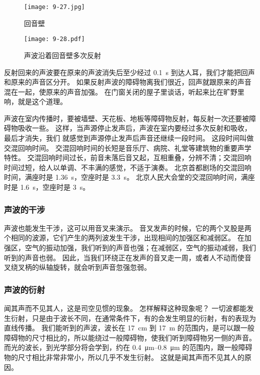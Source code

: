 \begin{figure}
  \begin{minipage}[b]{0.55\linewidth}\centering
    \texttt{[image: 9-27.jpg]}
    \caption{回音壁}\label{fig:9-27}
  \end{minipage}\hfill
  \begin{minipage}[b]{0.42\linewidth}\centering
    \texttt{[image: 9-28.pdf]}
    \caption{声波沿着回音壁多次反射}\label{fig:9-28}
  \end{minipage}
\end{figure}

反射回来的声波要在原来的声波消失后至少经过 \qty{0.1}{s} 到达人耳，我们才能把回声和原来的声音区分开。
如果反射声波的障碍物离我们很近，回声就跟原来的声音混在一起，使原来的声音加强。
在门窗关闭的屋子里谈话，听起来比在旷野里响，就是这个道理。

声波在室内传播时，要被墙壁、天花板、地板等障碍物反射，每反射一次还要被障碍物吸收一些。
这样，当声源停止发声后，声波在室内要经过多次反射和吸收，最后才消失，我们
就感觉到声源停止发声后声音还继续一段时间。
这段时间叫做交混回响时间。
交混回响时间的长短是音乐厅、病院、礼堂等建筑物的重要声学特性。
交混回响时间过长，前音未落后音又起，互相重叠，分辨不清；交混回响时间过短，给人以单调、不丰满的感觉，不适于演奏。
北京首都剧场的交混回响时间，满座时是 \qty{1.36}{s}，空座时是 \qty{3.3}{s}。
北京人民大会堂的交混回响时间，满座时是 \qty{1.6}{s}，空座时是 \qty{3}{s}。

\subsubsection{声波的干涉}
声波也能发生干涉，这可以用音叉来演示。
音叉发声的时候，它的两个叉股是两个相同的波源，它们产生的两列波发生干涉，出现相间的加强区和减弱区。
在加强区，空气的振动加强，我们听到的声音也强；在减弱区，空气的振动减弱，我们听到的声音也弱。
因此，当我们环绕正在发声的音叉走一周，或者人不动而使音叉绕叉柄的纵轴旋转，就会听到声音忽强忽弱。

\subsubsection{声波的衍射}
闻其声而不见其人，这是司空见惯的现象。
怎样解释这种现象呢？
一切波都能发生衍射，只是由于波长不同，在通常条件下，有的会发生明显的衍射，有的表现为直线传播。
我们能听到的声波，波长在 \qty{17}{cm} 到 \qty{17}{m} 的范围内，是可以跟一般障碍物的尺寸相比的，所以能绕过一般障碍物，使我们听到障碍物另一侧的声音。
而光的波长，到光学部分将会学到，约在 \qtyrange{0.4}{0.8}{\micro m} 的范围内，跟一般障碍物的尺寸相比非常非常小，所以几乎不发生衍射。
这就是闻其声而不见其人的原因。

